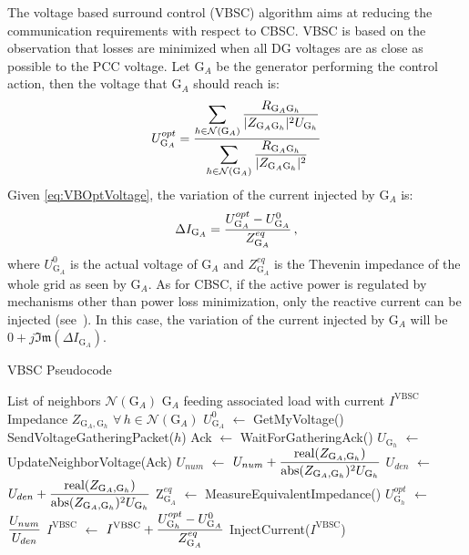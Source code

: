 \documentclass[journal]{IEEEtran}
\def\abs {{\rm abs}}
\begin{document}
The voltage based surround control (VBSC) algorithm \cite{SurroundControl} aims at reducing the communication requirements with respect to CBSC. VBSC is based on the observation that losses are minimized when all DG voltages are as close as possible to the PCC voltage. Let $\text{G}_A$ be the generator performing the control action, then the voltage that $\text{G}_A$ should reach is:
\begin{equation}
U_{\text{G}_A}^{opt} = {{\displaystyle\sum_{h\in \mathcal N(\text{G}_A)}{{R_{\text{G}_A\text{G}_h}}\over{|Z_{\text{G}_A\text{G}_h}|^2}U_{\text{G}_h}}}\over{\displaystyle\sum_{h\in \mathcal N(\text{G}_A)}{{R_{\text{G}_A\text{G}_h}}\over{|Z_{\text{G}_A\text{G}_h}|^2}}}}\label{eq:VBOptVoltage}
\end{equation}
Given \eqref{eq:VBOptVoltage}, the variation of the current injected by $\text{G}_A$ is:
\begin{equation}
\Delta I_{\text{G}_A} = {{U_{\text{G}_A}^{opt}-U_{\text{G}_A}^{0}}\over{Z^{eq}_{\text{G}_A}}}\,,\label{eq:VBOptCurrent}
\end{equation}
where $U_{\text{G}_A}^{0}$ is the actual voltage of $\text{G}_A$ and $Z^{eq}_{\text{G}_A}$ is the Thevenin impedance of the whole grid as seen by $\text{G}_A$. As for CBSC, if the active power is regulated by mechanisms other than power loss minimization, only the reactive current can be injected (see~\cite{SurroundControl}). In this case, the variation of the current injected by $\text{G}_A$ will be $0+j\mathfrak{Im}(\Delta I_{\text{G}_A})$.

\begin{algorithm}
\caption{VBSC Pseudocode}\label{algo:VBControlAlgo}
\begin{algorithmic}[1]
\REQUIRE List of neighbors $\mathcal N(\text{G}_A)$
\REQUIRE $\text{G}_A$ feeding associated load with current $I^{\text{VBSC}}$
\REQUIRE Impedance $Z_{\text{G}_A,\text{G}_h}$ $\forall \, h\in \mathcal N(\text{G}_A)$
\STATE $U^{0}_{\text{G}_A}$ $\leftarrow$ GetMyVoltage() \label{line:GetVoltage}
\STATE SendVoltageGatheringPacket($h$) \label{line:sendPkt}
\STATE Ack $\leftarrow$ WaitForGatheringAck() \label{line:rxAck}
\STATE $U_{\text{G}_h}$ $\leftarrow$ UpdateNeighborVoltage(Ack) \label{line:setNeighVoltage}
\STATE $\displaystyle{U_{num}}$ $\leftarrow$ $\displaystyle{U_{num}}+\displaystyle{\text{real}(Z_{\text{G}_A,\text{G}_h})\over{\abs(Z_{\text{G}_A,\text{G}_h})^2U_{\text{G}_h}}}$ \label{line:calcNum}
\STATE $\displaystyle{U_{den}}$ $\leftarrow$ $\displaystyle{U_{den}}+\displaystyle{\text{real}(Z_{\text{G}_A,\text{G}_h})\over{\abs(Z_{\text{G}_A,\text{G}_h})^2U_{\text{G}_h}}}$ \label{line:calcDen}
\ENDFOR
\STATE $\text{Z}^{eq}_{\text{G}_A}$ $\leftarrow$ MeasureEquivalentImpedance() \label{line:GetThImp}
\STATE $\displaystyle U^{opt}_{{\text{G}_h}}$ $\leftarrow$ $\displaystyle{U_{num}\over{U_{den}}}$ \label{line:compOptVoltage}
\STATE $\displaystyle I^{\text{VBSC}}$ $\leftarrow$ $\displaystyle I^{\text{VBSC}}+ \displaystyle{{U^{opt}_{\text{G}_h}-U^{0}_{\text{G}_A}}\over{Z^{eq}_{\text{G}_A}}}$ \label{line:updateCur}
\STATE InjectCurrent($I^{\text{VBSC}}$) \label{line:injCur}
\end{algorithmic}
\end{algorithm}
\end{document}
